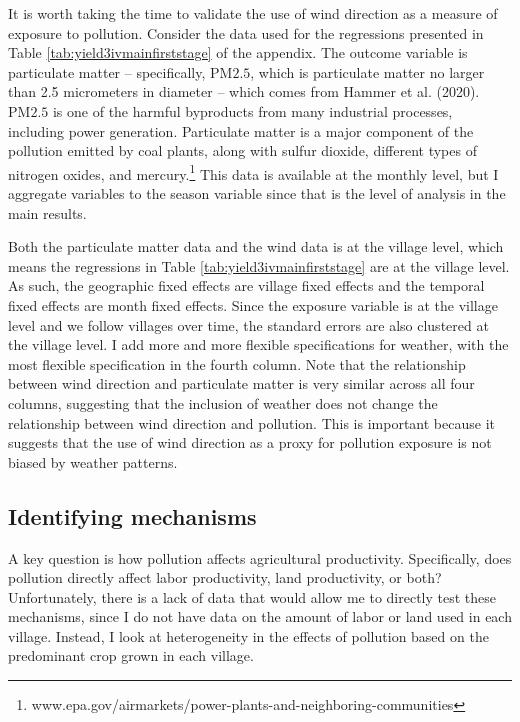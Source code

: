 \documentclass[
]{article}
\begin{document}
It is worth taking the time to validate the use of wind direction as a measure of exposure to pollution. Consider the data used for the regressions presented in Table \ref{tab:yield3ivmainfirststage} of the appendix. The outcome variable is particulate matter -- specifically, \(\mathrm{PM 2.5}\), which is particulate matter no larger than 2.5 micrometers in diameter -- which comes from Hammer et al. (2020). \(\mathrm{PM 2.5}\) is one of the harmful byproducts from many industrial processes, including power generation. Particulate matter is a major component of the pollution emitted by coal plants, along with sulfur dioxide, different types of nitrogen oxides, and mercury.\footnote{www.epa.gov/airmarkets/power-plants-and-neighboring-communities} This data is available at the monthly level, but I aggregate variables to the season variable since that is the level of analysis in the main results.

Both the particulate matter data and the wind data is at the village level, which means the regressions in Table \ref{tab:yield3ivmainfirststage} are at the village level. As such, the geographic fixed effects are village fixed effects and the temporal fixed effects are month fixed effects. Since the exposure variable is at the village level and we follow villages over time, the standard errors are also clustered at the village level. I add more and more flexible specifications for weather, with the most flexible specification in the fourth column. Note that the relationship between wind direction and particulate matter is very similar across all four columns, suggesting that the inclusion of weather does not change the relationship between wind direction and pollution. This is important because it suggests that the use of wind direction as a proxy for pollution exposure is not biased by weather patterns.

\hypertarget{identifying-mechanisms}{%
\subsection{Identifying mechanisms}\label{identifying-mechanisms}}

A key question is how pollution affects agricultural productivity. Specifically, does pollution directly affect labor productivity, land productivity, or both? Unfortunately, there is a lack of data that would allow me to directly test these mechanisms, since I do not have data on the amount of labor or land used in each village. Instead, I look at heterogeneity in the effects of pollution based on the predominant crop grown in each village.
\end{document}
